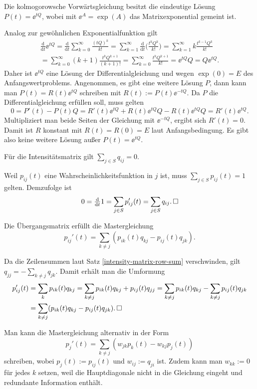 \begin{Satz}
Die kolmogorowsche Vorwärtsgleichung besitzt die eindeutige Lösung
$P(t)=\ee^{tQ}$, wobei mit $\ee^A=\exp(A)$ das Matrixexponential
gemeint ist. 
\end{Satz}
\begin{Beweis}
Analog zur gewöhnlichen Exponentialfunktion gilt
\begin{gather*}
\frac{\mathrm d}{\mathrm dt}\ee^{tQ}
= \frac{\mathrm d}{\mathrm dt}\sum_{k=0}^\infty \frac{(tQ)^k}{k!}
= \sum_{k=1}^\infty \frac{\mathrm d}{\mathrm dt}\bigg(\frac{t^k Q^k}{k!}\bigg)
= \sum_{k=1}^\infty k\frac{t^{k-1} Q^k}{k!}\\
= \sum_{k=0}^\infty (k+1)\frac{t^k Q^{k+1}}{(k+1)!}
= \sum_{k=0}^\infty \frac{t^k Q^{k+1}}{k!} = \ee^{tQ}Q = Q\ee^{tQ}.
\end{gather*}
Daher ist $\ee^{tQ}$ eine Lösung der Differentialgleichung und
wegen $\exp(0)=E$ des Anfangswertproblems. Angenommen, es gibt eine
weitere Lösung $P$, dann kann man $P(t) = R(t)\ee^{tQ}$
schreiben mit $R(t):=P(t)\ee^{-tQ}$. Da $P$ die
Differentialgleichung erfüllen soll, muss gelten
\[0 = P'(t) - P(t)Q = R'(t)\ee^{tQ} + R(t)\ee^{tQ}Q - R(t)\ee^{tQ}Q = R'(t)\ee^{tQ}.\]
Multipliziert man beide Seiten der Gleichung mit $\ee^{-tQ}$, ergibt sich
$R'(t)=0$. Damit ist $R$ konstant mit $R(t)=R(0)=E$ laut Anfangsbedingung.
Es gibt also keine weitere Lösung außer $P(t)=\ee^{tQ}$.\,\qedsymbol
\end{Beweis}

\begin{Satz}\label{intensity-matrix-row-sum}
Für die Intensitätsmatrix gilt $\sum_{j\in S} q_{ij} = 0$.
\end{Satz}
\begin{Beweis}
Weil $p_{ij}(t)$ eine Wahrscheinlichkeitsfunktion in $j$ ist, muss
$\sum_{j\in S}p_{ij}(t)=1$ gelten. Demzufolge ist
\[0  = \tfrac{\mathrm d}{\mathrm dt} 1 = \sum_{j\in S} p_{ij}'(t)
= \sum_{j\in S} q_{ij}.\,\square\]
\end{Beweis}

\begin{Satz}[Mastergleichung]\newlinefirst
Die Übergangsmatrix erfüllt die Mastergleichung
\[p_{ij}'(t) = \sum_{k\ne j} (p_{ik}(t)q_{kj} - p_{ij}(t)q_{jk}).\]
\end{Satz}
\begin{Beweis}
Da die Zeilensummen laut Satz \ref{intensity-matrix-row-sum}
verschwinden, gilt $q_{jj} = -\sum_{k\ne j} q_{jk}$.
Damit erhält man die Umformung
\begin{align*}
p_{ij}'(t) &= \sum_k p_{ik}(t)q_{kj}
= \sum_{k\ne j} p_{ik}(t)q_{kj} + p_{ij}(t)q_{jj}
= \sum_{k\ne j} p_{ik}(t)q_{kj} - \sum_{k\ne j} p_{ij}(t)q_{jk}\\
&= \sum_{k\ne j} (p_{ik}(t)q_{kj} - p_{ij}(t)q_{jk}).\,\square
\end{align*}
\end{Beweis}
 Man kann die Mastergleichung alternativ in der Form
\[p_j'(t) = \sum_{k\ne j} (w_{jk}p_k(t) - w_{kj}p_j(t))\]
schreiben, wobei $p_j(t):=p_{ij}(t)$ und $w_{ij}:=q_{ji}$ ist.
Zudem kann man $w_{kk}:=0$ für jedes $k$ setzen, weil die Hauptdiagonale
nicht in die Gleichung eingeht und redundante Information enthält.


